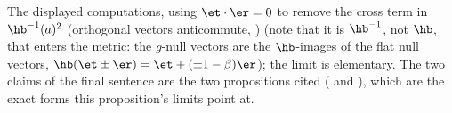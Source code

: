 The displayed computations, using $\et \cdot \er = 0$ to remove the cross term in $\hb^{-1}(a)^{2}$ (orthogonal vectors anticommute, ) (note that it is $\hb^{-1}$, not $\hb$, that enters the metric: the $g$-null vectors are the $\hb$-images of the flat null vectors, $\hb(\et \pm \er) = \et + (\pm 1 - \beta)\er$); the limit is elementary. The two claims of the final sentence are the two propositions cited ( and ), which are the exact forms this proposition's limits point at.
